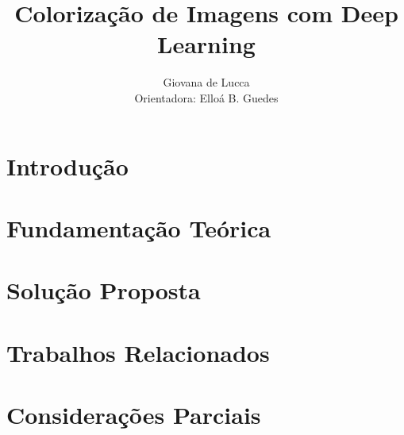 \documentclass[12pt]{article}
\title{Colorização de Imagens com Deep Learning}
\author{Giovana de Lucca\\Orientadora: Elloá B. Guedes}
\begin{document}
\maketitle


\section{Introdução} \label{sec:introducao}


\section{Fundamentação Teórica} \label{sec:fundamentacao}


\section{Solução Proposta} \label{sec:solucao}


\section{Trabalhos Relacionados} \label{sec:relacionados}


\section{Considerações Parciais} \label{sec:consideracoes}



\end{document}
